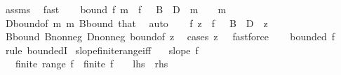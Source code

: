 \begin{isabellebody}
\ assms\ \isamarkupfalse%
\ fast\isanewline
\isanewline
\ \ \isamarkupfalse%
\ bound{\isacharcolon}{\kern0pt}\ {\isachardoublequoteopen}{\isasymbar}f\ {\isacharparenleft}{\kern0pt}{\isacharminus}{\kern0pt}m{\isacharparenright}{\kern0pt}{\isasymbar}\ {\isasymle}\ {\isasymbar}f\ {}{\isasymbar}\ {\isacharplus}{\kern0pt}\ B\ {\isacharplus}{\kern0pt}\ D{\isachardoublequoteclose}\ \ {\isachardoublequoteopen}m\ {\isasymge}\ {}{\isachardoublequoteclose}\ \ m\ \isamarkupfalse%
\ D{\isacharunderscore}{\kern0pt}bound{\isacharbrackleft}{\kern0pt}of\ {\isachardoublequoteopen}{\isacharminus}{\kern0pt}m{\isachardoublequoteclose}\ m{\isacharbrackright}{\kern0pt}\ B{\isacharunderscore}{\kern0pt}bound\ that\ \isamarkupfalse%
\ auto\isanewline
\isanewline
\ \ \isamarkupfalse%
\ {\isachardoublequoteopen}{\isasymbar}f\ z{\isasymbar}\ {\isasymle}\ {\isasymbar}f\ {}{\isasymbar}\ {\isacharplus}{\kern0pt}\ B\ {\isacharplus}{\kern0pt}\ D{\isachardoublequoteclose}\ \ z\ \isamarkupfalse%
\ B{\isacharunderscore}{\kern0pt}bound\ B{\isacharunderscore}{\kern0pt}nonneg\ D{\isacharunderscore}{\kern0pt}nonneg\ bound{\isacharbrackleft}{\kern0pt}of\ {\isachardoublequoteopen}{\isacharminus}{\kern0pt}z{\isachardoublequoteclose}{\isacharbrackright}{\kern0pt}\ \isamarkupfalse%
\ {\isacharparenleft}{\kern0pt}cases\ {\isachardoublequoteopen}z\ {\isasymge}\ {}{\isachardoublequoteclose}{\isacharparenright}{\kern0pt}\ fastforce{\isacharplus}{\kern0pt}\isanewline
\ \ \isamarkupfalse%
\ {\isachardoublequoteopen}bounded\ f{\isachardoublequoteclose}\ \isamarkupfalse%
\ {\isacharparenleft}{\kern0pt}rule\ boundedI{\isacharparenright}{\kern0pt}\isanewline
{}\isamarkupfalse%
%
\endisatagproof
{\isafoldproof}%
%
\isadelimproof
\isanewline
%
\endisadelimproof
\isanewline
{}\isamarkupfalse%
\ slope{\isacharunderscore}{\kern0pt}finite{\isacharunderscore}{\kern0pt}range{\isacharunderscore}{\kern0pt}iff{\isacharcolon}{\kern0pt}\isanewline
\ \ \ {\isachardoublequoteopen}slope\ f{\isachardoublequoteclose}\isanewline
\ \ \ {\isachardoublequoteopen}finite\ {\isacharparenleft}{\kern0pt}range\ f{\isacharparenright}{\kern0pt}\ {\isasymlongleftrightarrow}\ finite\ {\isacharparenleft}{\kern0pt}f\ {\isacharbackquote}{\kern0pt}\ {\isacharbraceleft}{\kern0pt}{}{\isachardot}{\kern0pt}{\isachardot}{\kern0pt}{\isacharbraceright}{\kern0pt}{\isacharparenright}{\kern0pt}{\isachardoublequoteclose}\ {\isacharparenleft}{\kern0pt}\ {\isachardoublequoteopen}{\isacharquery}{\kern0pt}lhs\ {\isasymlongleftrightarrow}\ {\isacharquery}{\kern0pt}rhs{\isachardoublequoteclose}{\isacharparenright}{\kern0pt}\isanewline

\end{isabellebody}
